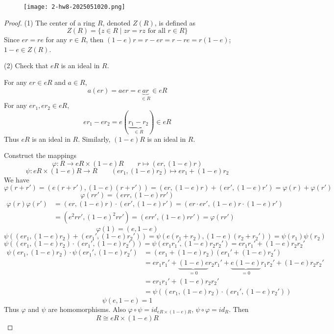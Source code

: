 \begin{exercise}
\begin{figure}[H]
\centering
\texttt{[image: 2-hw8-2025051020.png]}
\label{}
\end{figure}
\end{exercise}
\begin{proof}
(1)
The center of a ring $R$, denoted $Z(R)$, is defined as
\[
Z(R)=\{z \in R \mid zr=r z \text { for all } r \in R\}
\]
Since $er=re$ for any $r\in R$, then $(1-e)r=r-er=r-re=r(1-e)$; $1-e\in Z(R)$.

(2)
Check that $eR$ is an ideal in $R$.

For any $er\in eR$ and $a\in R$,
\[
a(er)=aer=e\underbrace{ ar }_{ \in R }\in eR
\]
For any $er_1, er_2\in eR$,
\[
er_1-er_2=e(\underbrace{ r_1-r_2 }_{ \in R })\in eR
\]
Thus $eR$ is an ideal in $R$. Similarly, $(1-e)R$ is an ideal in $R$.

Construct the mappings
\[
\varphi:R\to eR\times(1-e)R\qquad r\mapsto (er,(1-e)r)
\]
\[
\psi:eR\times(1-e)R\to R\qquad (er_1,(1-e)r_2)\mapsto er_1+(1-e)r_2
\]
We have
\[
\varphi(r+r')=(e(r+r'),(1-e)(r+r'))=(er,(1-e)r)+(er',(1-e)r')=\varphi(r)+\varphi(r')
\]
\[
\varphi(rr')=(err,(1-e)rr')
\]
\[
\begin{aligned}
\varphi(r)\varphi(r') & =(er,(1-e)r)\cdot(er',(1-e)r')=(er \cdot er',(1-e)r\cdot(1-e)r') \\
 & =(e^2rr',(1-e)^2rr')=(err',(1-e)rr')=\varphi(rr')
\end{aligned}
\]
\[
\varphi(1)=(e,1-e)
\]
\[
\psi((er_1,(1-e)r_2)+(er_1',(1-e)r_2'))=\psi(e(r_1+r_2),(1-e)(r_2+r_2'))=\psi(r_1)\psi(r_2)
\]
\[
\psi((er_1,(1-e)r_2)\cdot(er_1',(1-e)r_2'))=\psi(er_1r_1',(1-e)r_2r_2')=er_1r_1'+(1-e)r_2r_2'
\]
\[
\begin{aligned}
\psi(er_1,(1-e)r_2)\cdot \psi(er_1',(1-e)r_2') & =(er_1+(1-e)r_2)(er_1'+(1-e)r_2') \\
 & =er_1r_1'+\underbrace{ (1-e)e }_{ =0 }r_2r_1'+\underbrace{ e(1-e) }_{ =0 }r_1r_2'+(1-e)r_2r_2' \\
 & =er_1r_1'+(1-e)r_2r_2' \\
 & =\psi((er_1,(1-e)r_2)\cdot(er_1',(1-e)r_2'))
\end{aligned}
\]
\[
\psi(e,1-e)=1
\]
Thus $\varphi$ and $\psi$ are homomorphisms. Also $\varphi \circ \psi=id_{eR\times(1-e)R}$, $\psi \circ \varphi=id_{R}$. Then
\[
R\cong eR\times(1-e)R
\]
\end{proof}

